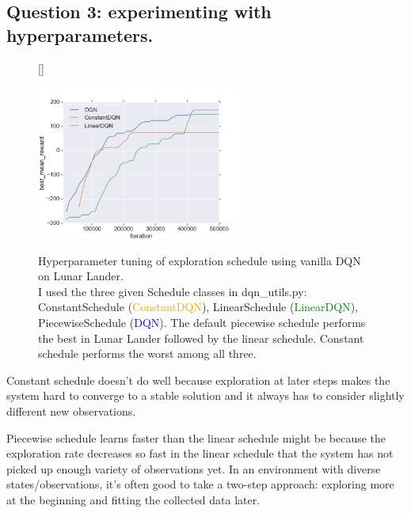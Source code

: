 \documentclass[12pt]{article}
\newcounter{question}
\begin{document}
	\subsection{Question 3: experimenting with hyperparameters.}
	\begin{figure}[!htbp] 
		[\FBwidth]
		{\caption[caption]{
				Hyperparameter tuning of exploration schedule using vanilla DQN on Lunar Lander.\\ 
				\hspace{0.4\textwidth}
				I used the three given Schedule classes in dqn\_utils.py: ConstantSchedule  (\textcolor{orange}{ConstantDQN}), LinearSchedule (\textcolor{green}{LinearDQN}), PiecewiseSchedule (\textcolor{blue}{DQN}).  The default piecewise schedule performs the best in Lunar Lander followed by the linear schedule. Constant schedule performs the worst among all three.
			}\label{fig:hyper}}
		{\includegraphics[width=0.6\textwidth]{question1_3.png}}
	\end{figure}
  Constant schedule doesn't do well because exploration at later steps makes the system hard to converge to a stable solution and it always has to consider slightly different new observations.\par
  Piecewise schedule learns faster than the linear schedule might be because the exploration rate decreases so fast in the linear schedule that the system has not picked up enough variety of observations yet.  In an environment with diverse states/observations, it's often good to take a two-step approach: exploring more at the beginning and fitting the collected data later.
  
\end{document}
